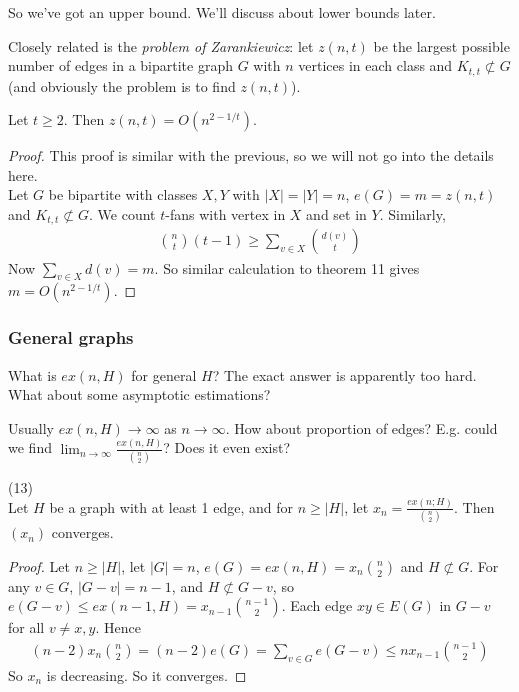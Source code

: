 \documentclass[a4paper]{article}
\begin{document}
So we've got an upper bound. We'll discuss about lower bounds later.

Closely related is the \emph{problem of Zarankiewicz}: let $z(n,t)$ be the largest possible number of edges in a bipartite graph $G$ with $n$ vertices in each class and $K_{t,t} \not\subset G$ (and obviously the problem is to find $z(n,t)$).

\begin{thm} 
Let $t \geq 2$. Then $z(n,t) = O(n^{2-1/t})$.
\begin{proof}
This proof is similar with the previous, so we will not go into the details here.\\
Let $G$ be bipartite with classes $X,Y$ with $|X| = |Y| = n$, $e(G) = m = z(n,t)$ and $K_{t,t} \not\subset G$. We count $t$-fans with vertex in $X$ and set in $Y$. Similarly,
\begin{equation*}
\begin{aligned}
{n \choose t} (t-1) \geq \sum_{v \in X} {d(v) \choose t}
\end{aligned}
\end{equation*}
Now $\sum_{v \in X} d(v) = m$. So similar calculation to theorem 11 gives $m=O(n^{2-1/t})$.
\end{proof}
\end{thm}

\subsubsection{General graphs}
What is $ex(n,H)$ for general $H$? The exact answer is apparently too hard. What about some asymptotic estimations?

Usually $ex(n,H) \to \infty$ as $n \to \infty$. How about proportion of edges? E.g. could we find $\lim_{n \to \infty} \frac{ex(n,H)}{{n \choose 2}}$? Does it even exist?

\begin{prop} (13)\\
Let $H$ be a graph with at least 1 edge, and for $n \geq |H|$, let $x_n = \frac{ex(n;H)}{{n \choose 2}}$. Then $(x_n)$ converges.
\begin{proof}
Let $n \geq |H|$, let $|G| = n$, $e(G) = ex(n,H) = x_n {n \choose 2}$ and $H \not\subset G$. For any $v \in G$, $|G-v| = n-1$, and $H \not\subset G-v$, so $e(G-v) \leq ex(n-1,H) = x_{n-1} {n-1 \choose 2}$. Each edge $xy \in E(G)$ in $G-v$ for all $v \neq x,y$. Hence
\begin{equation*}
\begin{aligned}
(n-2) x_n {n\choose 2} = (n-2) e(G) = \sum_{v \in G} e(G-v) \leq n x_{n-1} {n-1 \choose 2}
\end{aligned}
\end{equation*}
So $x_n$ is decreasing. So it converges.
\end{proof}
\end{prop}
\end{document}
